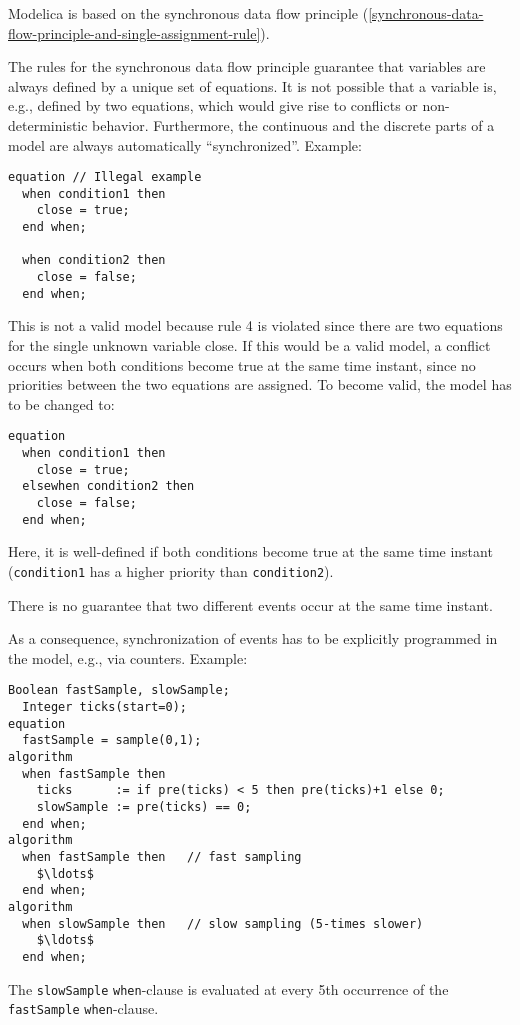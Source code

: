 Modelica is based on the synchronous data flow principle (\cref{synchronous-data-flow-principle-and-single-assignment-rule}).

\begin{nonnormative}
The rules for the synchronous data flow principle guarantee that variables are always defined by a unique set of equations.
It is not possible that a variable is, e.g., defined by two equations, which would give rise to conflicts or non-deterministic behavior.
Furthermore, the continuous and the discrete parts of a model are always automatically ``synchronized''.
Example:
\begin{lstlisting}[language=modelica]
equation // Illegal example
  when condition1 then
    close = true;
  end when;

  when condition2 then
    close = false;
  end when;
\end{lstlisting}

This is not a valid model because rule 4 is violated since there are two equations for the single unknown variable close.
If this would be a valid model, a conflict occurs when both conditions become true at the same time instant, since no priorities between the two equations are assigned.
To become valid, the model has to be changed to:
\begin{lstlisting}[language=modelica]
equation
  when condition1 then
    close = true;
  elsewhen condition2 then
    close = false;
  end when;
\end{lstlisting}

Here, it is well-defined if both conditions become true at the same time instant (\lstinline!condition1! has a higher priority than \lstinline!condition2!).
\end{nonnormative}

There is no guarantee that two different events occur at the same time instant.

\begin{nonnormative}
As a consequence, synchronization of events has to be explicitly programmed in the model, e.g., via counters.
Example:
\begin{lstlisting}[language=modelica]
  Boolean fastSample, slowSample;
  Integer ticks(start=0);
equation
  fastSample = sample(0,1);
algorithm
  when fastSample then
    ticks      := if pre(ticks) < 5 then pre(ticks)+1 else 0;
    slowSample := pre(ticks) == 0;
  end when;
algorithm
  when fastSample then   // fast sampling
    $\ldots$
  end when;
algorithm
  when slowSample then   // slow sampling (5-times slower)
    $\ldots$
  end when;
\end{lstlisting}

The \lstinline!slowSample! \lstinline!when!-clause is evaluated at every 5th occurrence of the \lstinline!fastSample! \lstinline!when!-clause.
\end{nonnormative}

